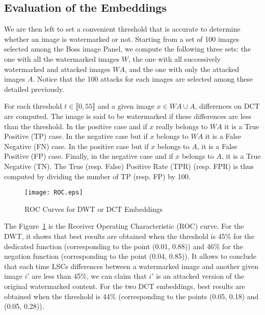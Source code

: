 \documentclass{comjnl}
\begin{document}
\subsection{Evaluation of the  Embeddings}\label{sub:roc}
We are then left to set a convenient threshold that is accurate to 
determine whether an image is watermarked or not.
Starting from a set of 100 images selected among the Boss image Panel,
we compute the following three sets: 
the one with all the watermarked images $W$,
the one with all successively watermarked and attacked images $\textit{WA}$,
and the one with only the attacked images $A$.
Notice that the 100 attacks for each images 
are selected among these detailed previously.


For each threshold $t \in \llbracket 0,55 \rrbracket$ and a given image 
$x \in \textit{WA} \cup A$, 
differences on DCT are computed. The image is said to be watermarked
if these differences are less than the threshold. 
In the positive case and if $x$ really belongs to 
$\textit{WA}$ it is a True Positive (TP) case.  
In the negative case but if $x$ belongs to 
$\textit{WA}$ it is a False Negative (FN) case.  
In the positive case but if $x$  belongs to 
$\textit{A}$, it is a False Positive (FP) case.  
Finally, in the negative case and if $x$ belongs to
$\textit{A}$, it is a True Negative (TN).  
The True (resp. False) Positive Rate  (TPR) (resp. FPR) is thus computed 
by dividing the number of TP (resp. FP) by 100.

\begin{figure}[ht]
\begin{center}
\texttt{[image: ROC.eps]}
\end{center}
\caption{ROC Curves for DWT or DCT Embeddings}\label{fig:roc:dwt}
\end{figure}

The Figure~\ref{fig:roc:dwt} is the Receiver Operating Characteristic (ROC) 
curve. 
For the DWT, it shows that best results are obtained when the threshold 
is 45\% for the dedicated function (corresponding to the point (0.01, 0.88))
and  46\% for the negation function (corresponding to the point (0.04, 0.85)).
It allows to conclude that each time LSCs differences between
a watermarked image and another given image  $i'$ are less than 45\%, we can claim that 
$i'$ is an attacked version of the original watermarked content.
For the two DCT embeddings, best results are obtained when the threshold 
is 44\% (corresponding to the points (0.05, 0.18) and (0.05, 0.28)).
\end{document}
